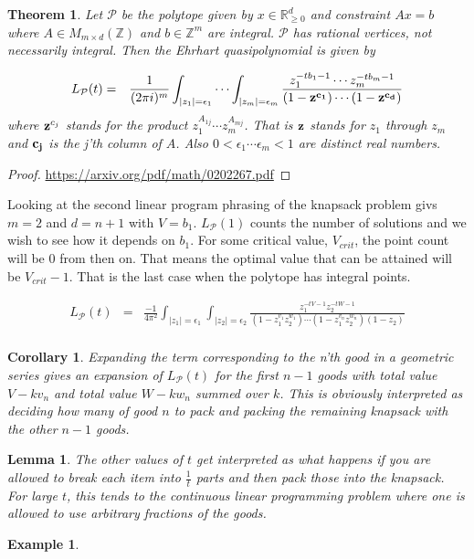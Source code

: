 \documentclass[11pt]{book}
\newcommand\abs[1]{ \mid #1 \mid }
\theoremstyle{change}
\newtheorem{theorem}[equation]{Theorem}
\newtheorem{lemma}[equation]{Lemma}
\newtheorem{cor}[equation]{Corollary}
\newtheorem{example}[equation]{Example}
\theoremstyle{nonumberplain}
\newtheorem{proof}{Proof}
\numberwithin{equation}{section}
\begin{document}
\begin{theorem}
Let $\mathcal{P}$ be the polytope given by $x \in \mathbb{R}_{\geq 0}^d$ and constraint $Ax = b$ where $A \in M_{m \times d}(\mathbb{Z})$ and $b \in \mathbb{Z}^m$ are integral. $\mathcal{P}$ has rational vertices, not necessarily integral. Then the Ehrhart quasipolynomial is given by

\begin{eqnarray*}
L_\mathcal{P} (t) &=& \frac{1}{(2\pi i)^m} \int_{\abs{z_1}=\epsilon_1} \cdots  \int_{\abs{z_m}=\epsilon_m} \frac{z_1^{-t b_1 -1} \cdots z_m^{-t b_m -1}}{(1-\bold{z}^{\bold{c_1}}) \cdots (1-\bold{z}^{\bold{c_d}})}\\
\end{eqnarray*}
where $\bold{z}^{c_j}$ stands for the product $z_1^{A_{1j}} \cdots z_m^{A_{mj}}$. That is $\bold{z}$ stands for $z_1$ through $z_m$ and $\bold{c_j}$ is the j'th column of $A$. Also $0 < \epsilon_1 \cdots \epsilon_m <1$ are distinct real numbers.

\end{theorem}

\begin{proof}
\url{https://arxiv.org/pdf/math/0202267.pdf}
\end{proof}

Looking at the second linear program phrasing of the knapsack problem givs $m=2$ and $d=n+1$ with $V=b_1$. $L_\mathcal{P} (1)$ counts the number of solutions and we wish to see how it depends on $b_1$. For some critical value, $V_{crit}$, the point count will be $0$ from then on. That means the optimal value that can be attained will be $V_{crit}-1$. That is the last case when the polytope has integral points.

\begin{eqnarray*}
L_\mathcal{P} (t) &=& \frac{-1}{4 \pi^2} \int_{\abs{z_1}=\epsilon_1} \int_{\abs{z_2}=\epsilon_2} \frac{z_1^{-t V -1} z_2^{-t W -1}}{(1-z_1^{v_1} z_2^{w_1}) \cdots (1-z_1^{v_n} z_2^{w_n}) (1-z_2)}\\
\end{eqnarray*}

\begin{cor}
Expanding the term corresponding to the n'th good in a geometric series gives an expansion of $L_\mathcal{P} (t)$ for the first $n-1$ goods with total value $V-kv_n$ and total value $W-kw_n$ summed over $k$. This is obviously interpreted as deciding how many of good $n$ to pack and packing the remaining knapsack with the other $n-1$ goods.
\end{cor}

\begin{lemma}
The other values of $t$ get interpreted as what happens if you are allowed to break each item into $\frac{1}{t}$ parts and then pack those into the knapsack. For large $t$, this tends to the continuous linear programming problem where one is allowed to use arbitrary fractions of the goods.
\end{lemma}

\begin{example}

\end{example}
\end{document}
